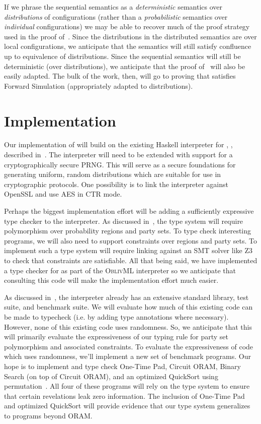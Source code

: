 If we phrase the sequential semantics as a \emph{deterministic} semantics over \emph{distributions} of configurations
(rather than a \emph{probabilistic} semantics over \emph{individual} configurations) we may be able to recover much
of the proof strategy used in the proof of~. Since the distributions in the distributed
semantics are over local configurations, we anticipate that the semantics will still satisfy confluence up to equivalence
of distributions. Since the sequential semantics will still be deterministic (over distributions), we anticipate that the
proof of~ will also be easily adapted. The bulk of the work, then, will go to proving that
\lang satisfies Forward Simulation (appropriately adapted to distributions).

\section{Implementation}
\label{sec:proposal-impl}

Our implementation of \lang will build on the existing Haskell interpreter for \mpc, \system, described in~.
The interpreter will need to be extended with support for a cryptographically secure PRNG. This will serve as a secure foundations for
generating uniform, random distributions which are suitable for use in cryptographic protocols. One possibility is to link the interpreter
against OpenSSL and use AES in CTR mode.

Perhaps the biggest implementation effort will be adding a sufficiently expressive type checker to the interpreter. As discussed
in~, the type system will require polymorphism over probability regions and party sets. To
type check interesting programs, we will also need to support constraints over regions and party sets. To implement such a type system
will require linking against an SMT solver like Z3~\cite{} to check that constraints are satisfiable. All that being said, we have
implemented a type checker for \obliv as part of the \textsc{OblivML} interpreter so we anticipate that consulting this code
will make the implementation effort much easier.

As discussed in~, the \system interpreter already has an extensive standard library, test suite, and benchmark
suite. We will evaluate how much of this existing \system code can be made to typecheck (i.e. by adding type annotations where necessary).
However, none of this existing code uses randomness. So, we anticipate that this will primarily evaluate the expressiveness of our
typing rule for party set polymorphism and associated constraints. To evaluate the expressiveness of code which uses randomness,
we'll implement a new set of benchmark programs. Our hope is to implement and type check One-Time Pad, Circuit ORAM,
Binary Search (on top of Circuit ORAM), and an optimized QuickSort using permutation~\cite{hamada}. All four of these programs
will rely on the type system to ensure that certain revelations leak zero information. The inclusion of One-Time
Pad and optimized QuickSort will provide evidence that our type system generalizes to programs beyond ORAM.

